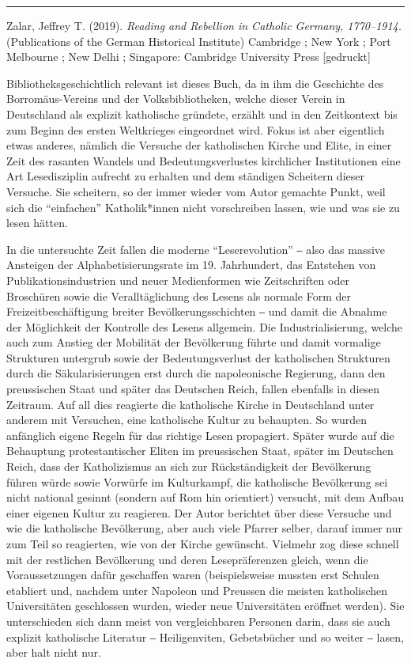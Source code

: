 \documentclass[a4paper,
fontsize=11pt,
oneside,
numbers=noperiodatend,
parskip=half-,
bibliography=totoc,
final
]{scrartcl}
\begin{document}
\begin{center}\rule{0.5\linewidth}{0.5pt}\end{center}

Zalar, Jeffrey T. (2019). \emph{Reading and Rebellion in Catholic
Germany, 1770--1914.} (Publications of the German Historical Institute)
Cambridge ; New York ; Port Melbourne ; New Delhi ; Singapore: Cambridge
University Press {[}gedruckt{]}

Bibliotheksgeschichtlich relevant ist dieses Buch, da in ihm die
Geschichte des Borromäus-Vereins und der Volksbibliotheken, welche
dieser Verein in Deutschland als explizit katholische gründete, erzählt
und in den Zeitkontext bis zum Beginn des ersten Weltkrieges eingeordnet
wird. Fokus ist aber eigentlich etwas anderes, nämlich die Versuche der
katholischen Kirche und Elite, in einer Zeit des rasanten Wandels und
Bedeutungsverlustes kirchlicher Institutionen eine Art Lesedisziplin
aufrecht zu erhalten und dem ständigen Scheitern dieser Versuche. Sie
scheitern, so der immer wieder vom Autor gemachte Punkt, weil sich die
\enquote{einfachen} Katholik*innen nicht vorschreiben lassen, wie und
was sie zu lesen hätten.

In die untersuchte Zeit fallen die moderne \enquote{Leserevolution} ‒
also das massive Ansteigen der Alphabetisierungsrate im 19. Jahrhundert,
das Entstehen von Publikationsindustrien und neuer Medienformen wie
Zeitschriften oder Broschüren sowie die Veralltäglichung des Lesens als
normale Form der Freizeitbeschäftigung breiter Bevölkerungsschichten ‒
und damit die Abnahme der Möglichkeit der Kontrolle des Lesens
allgemein. Die Industrialisierung, welche auch zum Anstieg der Mobilität
der Bevölkerung führte und damit vormalige Strukturen untergrub sowie
der Bedeutungsverlust der katholischen Strukturen durch die
Säkularisierungen erst durch die napoleonische Regierung, dann den
preussischen Staat und später das Deutschen Reich, fallen ebenfalls in
diesen Zeitraum. Auf all dies reagierte die katholische Kirche in
Deutschland unter anderem mit Versuchen, eine katholische Kultur zu
behaupten. So wurden anfänglich eigene Regeln für das richtige Lesen
propagiert. Später wurde auf die Behauptung protestantischer Eliten im
preussischen Staat, später im Deutschen Reich, dass der Katholizismus an
sich zur Rückständigkeit der Bevölkerung führen würde sowie Vorwürfe im
Kulturkampf, die katholische Bevölkerung sei nicht national gesinnt
(sondern auf Rom hin orientiert) versucht, mit dem Aufbau einer eigenen
Kultur zu reagieren. Der Autor berichtet über diese Versuche und wie die
katholische Bevölkerung, aber auch viele Pfarrer selber, darauf immer
nur zum Teil so reagierten, wie von der Kirche gewünscht. Vielmehr zog
diese schnell mit der restlichen Bevölkerung und deren Lesepräferenzen
gleich, wenn die Voraussetzungen dafür geschaffen waren (beispielsweise
mussten erst Schulen etabliert und, nachdem unter Napoleon und Preussen
die meisten katholischen Universitäten geschlossen wurden, wieder neue
Universitäten eröffnet werden). Sie unterschieden sich dann meist von
vergleichbaren Personen darin, dass sie auch explizit katholische
Literatur ‒ Heiligenviten, Gebetsbücher und so weiter ‒ lasen, aber halt
nicht nur.
\end{document}
